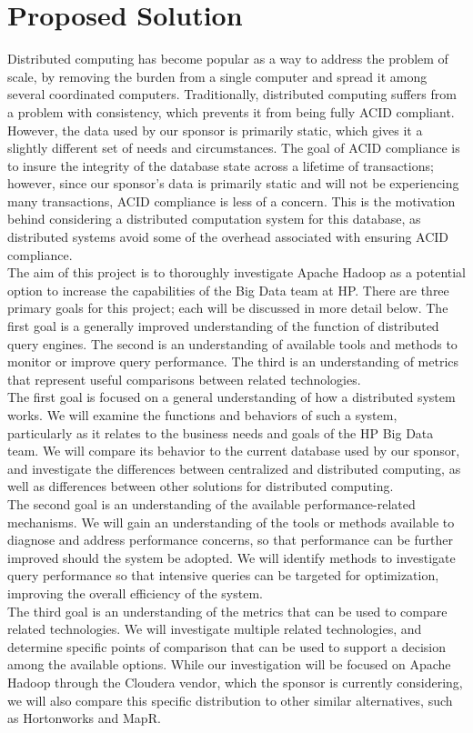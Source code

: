 \documentclass[onecolumn, draftclsnofoot,10pt, compsoc]{IEEEtran}
\begin{document}
\section{Proposed Solution}
\indent Distributed computing has become popular as a way to address the problem of scale, by removing the burden from a single computer and spread it among several coordinated computers. Traditionally, distributed computing suffers from a problem with consistency, which prevents it from being fully ACID compliant.  However, the data used by our sponsor is primarily static, which gives it a slightly different set of needs and circumstances. The goal of ACID compliance is to insure the integrity of the database state across a lifetime of transactions; however, since our sponsor’s data is primarily static and will not be experiencing many transactions, ACID compliance is less of a concern. This is the motivation behind considering a distributed computation system for this database, as distributed systems avoid some of the overhead associated with ensuring ACID compliance.\\
\indent The aim of this project is to thoroughly investigate Apache Hadoop as a potential option to increase the capabilities of the Big Data team at HP. There are three primary goals for this project; each will be discussed in more detail below. The first goal is a generally improved understanding of the function of distributed query engines. The second is an understanding of available tools and methods to monitor or improve query performance. The third is an understanding of metrics that represent useful comparisons between related technologies.\\
\indent The first goal is focused on a general understanding of how a distributed system works. We will examine the functions and behaviors of such a system, particularly as it relates to the business needs and goals of the HP Big Data team. We will compare its behavior to the current database used by our sponsor, and investigate the differences between centralized and distributed computing, as well as differences between other solutions for distributed computing.\\
\indent The second goal is an understanding of the available performance-related mechanisms. We will gain an understanding of the tools or methods available to diagnose and address performance concerns, so that performance can be further improved should the system be adopted. We will identify methods to investigate query performance so that intensive queries can be targeted for optimization, improving the overall efficiency of the system.\\
\indent The third goal is an understanding of the metrics that can be used to compare related technologies. We will investigate multiple related technologies, and determine specific points of comparison that can be used to support a decision among the available options. While our investigation will be focused on Apache Hadoop through the Cloudera vendor, which the sponsor is currently considering, we will also compare this specific distribution to other similar alternatives, such as Hortonworks and MapR.
\end{document}

